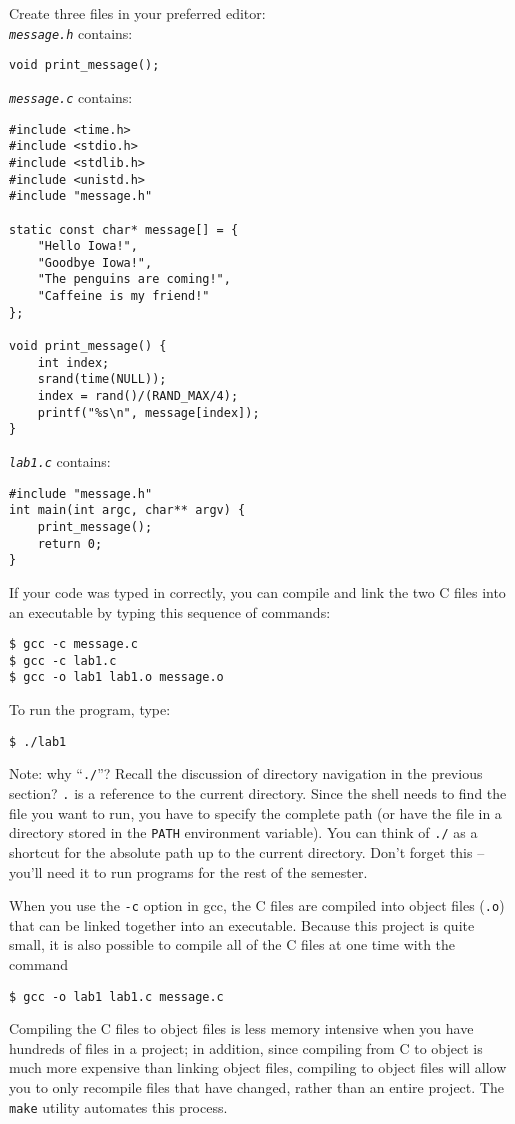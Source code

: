 \documentclass[letterpaper,10pt]{article}
\newcommand{\cmd}[1]{\texttt{#1}}
\begin{document}
Create three files in your preferred editor:
\\
\emph{\texttt{message.h}} contains:
\begin{verbatim}
void print_message();
\end{verbatim}
\emph{\texttt{message.c}} contains:
\begin{verbatim}
#include <time.h>
#include <stdio.h>
#include <stdlib.h>
#include <unistd.h>
#include "message.h"

static const char* message[] = {
    "Hello Iowa!",
    "Goodbye Iowa!",
    "The penguins are coming!",
    "Caffeine is my friend!"
};

void print_message() {
    int index;
    srand(time(NULL));
    index = rand()/(RAND_MAX/4);
    printf("%s\n", message[index]);
}
\end{verbatim}
\emph{\texttt{lab1.c}} contains:
\begin{verbatim}
#include "message.h"
int main(int argc, char** argv) {
    print_message();
    return 0;
}
\end{verbatim}
If your code was typed in correctly, you can compile and link the two C files into an executable by typing this sequence of commands:
\begin{verbatim}
$ gcc -c message.c
$ gcc -c lab1.c
$ gcc -o lab1 lab1.o message.o
\end{verbatim}
To run the program, type:
\begin{verbatim}
$ ./lab1
\end{verbatim}

Note: why ``\texttt{./}''? Recall the discussion of directory navigation in the previous section? \texttt{.} is a reference to the current directory. Since the shell needs to find the file you want to run, you have to specify the complete path (or have the file in a directory stored in the \cmd{PATH} environment variable). You can think of \cmd{./} as a shortcut for the absolute path up to the current directory. Don't forget this -- you'll need it to run programs for the rest of the semester.

When you use the \cmd{-c} option in gcc, the C files are compiled into object files (\cmd{.o}) that can be linked together into an executable. Because this project is quite small, it is also possible to compile all of the C files at one time with the command
\begin{verbatim}
$ gcc -o lab1 lab1.c message.c
\end{verbatim}
Compiling the C files to object files is less memory intensive when you have hundreds of files in a project; in addition, since compiling from C to object is much more expensive than linking object files, compiling to object files will allow you to only recompile files that have changed, rather than an entire project. The \cmd{make} utility automates this process.
\end{document}
